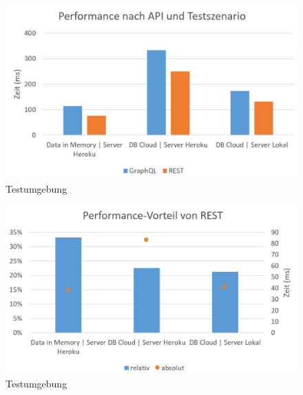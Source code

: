 \begin{figure}[h!]
  \centering
  \includegraphics[width=\linewidth]{../Kapitel/Grafiken/performance-szenario.png}
  \caption{Testumgebung}
  \label{img:REST-diss}
\end{figure}
\begin{figure}[h!]
  \centering
  \includegraphics[width=\linewidth]{../Kapitel/Grafiken/performance-diff.png}
  \caption{Testumgebung}
  \label{img:REST-diss}
\end{figure}

